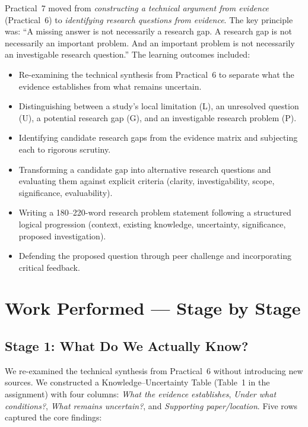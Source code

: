 \documentclass[11pt, a4paper]{article}
\begin{document}
Practical~7 moved from \emph{constructing a technical argument from evidence} (Practical~6) to \emph{identifying research questions from evidence}. The key principle was: ``A missing answer is not necessarily a research gap. A research gap is not necessarily an important problem. And an important problem is not necessarily an investigable research question.'' The learning outcomes included:

\begin{itemize}[nosep]
    \item Re-examining the technical synthesis from Practical~6 to separate what the evidence establishes from what remains uncertain.
    \item Distinguishing between a study's local limitation (L), an unresolved question (U), a potential research gap (G), and an investigable research problem (P).
    \item Identifying candidate research gaps from the evidence matrix and subjecting each to rigorous scrutiny.
    \item Transforming a candidate gap into alternative research questions and evaluating them against explicit criteria (clarity, investigability, scope, significance, evaluability).
    \item Writing a 180--220-word research problem statement following a structured logical progression (context, existing knowledge, uncertainty, significance, proposed investigation).
    \item Defending the proposed question through peer challenge and incorporating critical feedback.
\end{itemize}

\section{Work Performed --- Stage by Stage}

\subsection{Stage 1: What Do We Actually Know?}
We re-examined the technical synthesis from Practical~6 without introducing new sources. We constructed a Knowledge--Uncertainty Table (Table~1 in the assignment) with four columns: \emph{What the evidence establishes}, \emph{Under what conditions?}, \emph{What remains uncertain?}, and \emph{Supporting paper/location}. Five rows captured the core findings:
\end{document}
